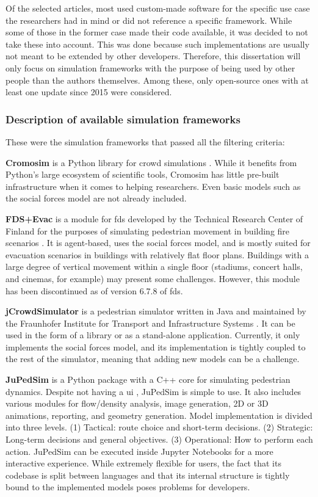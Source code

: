 \documentclass[twoside, 11pt]{article}
\begin{document}
Of the selected articles, most used custom-made software for the specific use case the researchers had in mind or did not reference a specific framework. While some of those in the former case made their code available, it was decided to not take these into account. This was done because such implementations are usually not meant to be extended by other developers. Therefore, this dissertation will only focus on simulation frameworks with the purpose of being used by other people than the authors themselves. Among these, only open-source ones with at least one update since 2015 were considered. 

\subsubsection{Description of available simulation frameworks}

These were the simulation frameworks that passed all the filtering criteria:

\textbf{Cromosim} is a Python library for crowd simulations \cite{cromosim}. While it benefits from Python's large ecosystem of scientific tools, Cromosim has little pre-built infrastructure when it comes to helping researchers. Even basic models such as the social forces model are not already included.

\textbf{FDS+Evac} is a module for \gls{fds} developed by the Technical Research Center of Finland for the purposes of simulating pedestrian movement in building fire scenarios \cite{korhonenFireDynamicsSimulator2009}. It is agent-based, uses the social forces model, and is mostly suited for evacuation scenarios in buildings with relatively flat floor plans. Buildings with a large degree of vertical movement within a single floor (stadiums, concert halls, and cinemas, for example) may present some challenges. However, this module has been discontinued as of version 6.7.8 of \gls{fds}.

\textbf{jCrowdSimulator} is a pedestrian simulator written in Java and maintained by the Fraunhofer Institute for Transport and Infrastructure Systems \cite{meinert2019simulation}. It can be used in the form of a library or as a stand-alone application. Currently, it only implements the social forces model, and its implementation is tightly coupled to the rest of the simulator, meaning that adding new models can be a challenge.

\textbf{JuPedSim} is a Python package with a C++ core for simulating pedestrian dynamics. Despite not having a \gls{ui} \cite{kemlohwagoumJuPedSimOpenFramework2015}, JuPedSim is simple to use. It also includes various modules for flow/density analysis, image generation, 2D or 3D animations, reporting, and geometry generation. Model implementation is divided into three levels. (1) Tactical: route choice and short-term decisions. (2) Strategic: Long-term decisions and general objectives. (3) Operational: How to perform each action. JuPedSim can be executed inside Jupyter Notebooks for a more interactive experience. While extremely flexible for users, the fact that its codebase is split between languages and that its internal structure is tightly bound to the implemented models poses problems for developers.
\end{document}
